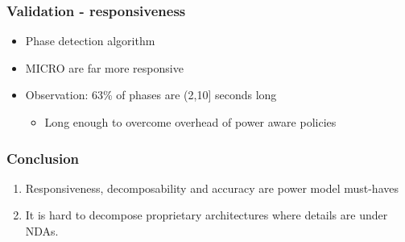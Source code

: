 \documentclass[screen]{beamer}
\begin{document}
\begin{frame}
    \frametitle{Validation - responsiveness}

    \begin{itemize}
        \item Phase detection algorithm
        \item {\ttfamily MICRO} are far more responsive

    \item Observation: 63\% of phases are (2,10] seconds long
        \begin{itemize}
            \item Long enough to overcome overhead of power aware policies
        \end{itemize}

    \end{itemize}

\end{frame}

\begin{frame}

    \frametitle{Conclusion}

    \begin{enumerate}
        \item Responsiveness, decomposability and accuracy are power model must-haves
        \item It is hard to decompose proprietary architectures where details are under NDAs.
    \end{enumerate}

\end{frame}




\end{document}
